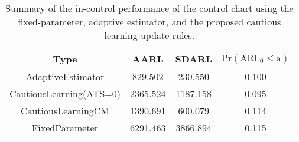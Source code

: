 \begin{table}[!h]

\caption{Summary of the in-control performance of the control chart using the fixed-parameter, adaptive estimator, and the proposed cautious learning update rules.}
\centering
\begin{tabular}[t]{cccc}
\toprule
Type & AARL & SDARL & $\text{Pr}(\text{ARL}_0 \leq \text{a})$\\
\midrule
AdaptiveEstimator & 829.502 & 230.550 & 0.100\\
CautiousLearning(ATS=0) & 2365.524 & 1187.158 & 0.095\\
CautiousLearningCM & 1390.691 & 600.079 & 0.114\\
FixedParameter & 6291.463 & 3866.894 & 0.115\\
\bottomrule
\end{tabular}
\end{table}
